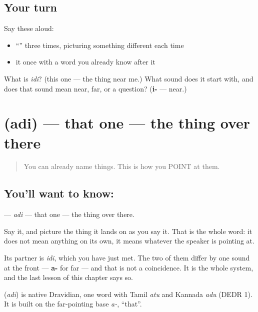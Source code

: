 \subsection*{Your turn}
Say these aloud:

\begin{itemize}
\raggedright
  \item \textquotedblleft{}\textquotedblright{} three times, picturing something different each time
  \item it once with a word you already know after it
\end{itemize}

\begin{tcolorbox}[breakable,colback=teal!4,colframe=teal!35!black,title={Before you move on}]
What is \emph{idi}? (this one — the thing near me.) What sound does it start with, and does that sound mean near, far, or a question? (\textbf{i-} — near.)
\end{tcolorbox}
\section[\texorpdfstring{\te{అది} (adi)}{అది (adi)}]{ (adi) — that one — the thing over there}

\label{lesson:TE-C41-that}



\begin{quote}
You can already name things. This is how you POINT at them.
\end{quote}

\subsection*{You'll want to know: }
\textbf{} — \emph{adi} — that one — the thing over there.

Say it, and picture the thing it lands on as you say it. That is the whole word: it does not mean anything on its own, it means whatever the speaker is pointing at.

Its partner is \textbf{} \emph{idi}, which you have just met. The two of them differ by one sound at the front — \textbf{a-} for far — and that is not a coincidence. It is the whole system, and the last lesson of this chapter says so.

\begin{cousinweb}
\textbf{} (\emph{adi}) is native Dravidian, one word with Tamil \emph{atu} and Kannada \emph{adu} (DEDR 1). It is built on the far-pointing base \emph{a-}, \textquotedblleft{}that\textquotedblright{}.
\end{cousinweb}

